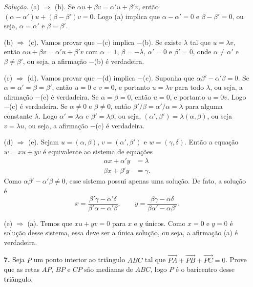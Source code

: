 \documentclass[a4paper,11pt]{article}
\begin{document}
\vspace{\baselineskip}

\emph{Solução.}
(a) $\Rightarrow$ (b).
Se $\alpha u + \beta v = \alpha' u + \beta' v$, então $(\alpha - \alpha')u + (\beta - \beta') v = 0$.
Logo (a) implica que $\alpha - \alpha' = 0$ e $\beta - \beta' = 0$, ou seja, $\alpha = \alpha'$ e $\beta = \beta'$.

(b) $\Rightarrow$ (c).
Vamos provar que $-$(c) implica $-$(b).
Se existe $\lambda$ tal que $u = \lambda v$, então $\alpha u + \beta v = \alpha' u + \beta' v$ com $\alpha = 1$, $\beta = -\lambda$, $\alpha' = 0$ e $\beta' = 0$, onde $\alpha \neq \alpha'$ e $\beta \neq \beta'$, ou seja, a afirmação $-$(b) é verdadeira.

(c) $\Rightarrow$ (d).
Vamos provar que $-$(d) implica $-$(c).
Suponha que $\alpha \beta' - \alpha' \beta = 0$.
Se $\alpha = \alpha' = \beta = \beta'$, então $u = 0$ e $v = 0$, e portanto $u = \lambda v$ para todo $\lambda$, ou seja, a afirmação $-$(c) é verdadeira.
Se $\alpha = \beta = 0$, então $u = 0$, e portanto $u = 0v$.
Logo $-$(c) é verdadeira.
Se $\alpha \neq 0$ e $\beta \neq 0$, então $\beta'/\beta = \alpha'/\alpha = \lambda$ para alguma constante $\lambda$.
Logo $\alpha' = \lambda \alpha$ e $\beta' = \lambda \beta$, ou seja, $(\alpha', \beta') = \lambda (\alpha, \beta)$, ou seja $v = \lambda u$, ou seja, a afirmação $-$(c) é verdadeira.

(d) $\Rightarrow$ (e).
Sejam $u = (\alpha,\beta)$, $v = (\alpha',\beta')$ e $w = (\gamma,\delta)$.
Então a equação $w = xu + yv$ é equivalente ao sistema de equações
\begin{align*}
  \alpha x + \alpha' y & = \lambda \\
  \beta x + \beta' y & = \gamma.
\end{align*}
Como $\alpha \beta' - \alpha' \beta \neq 0$, esse sistema possui apenas uma solução.
De fato, a solução é
\[
  x = \frac{\beta' \gamma - \alpha' \delta}{\beta' \alpha - \alpha' \beta}, \qquad y = \frac{\beta \gamma - \alpha \delta}{\beta \alpha' - \alpha \beta'}.
\]

(e) $\Rightarrow$ (a).
Temos que $xu + yv = 0$ para $x$ e $y$ únicos.
Como $x = 0$ e $y = 0$ é solução desse sistema, essa deve ser a única solução, ou seja, a afirmação (a) é verdadeira.

\vspace{\baselineskip}

\textbf{7.}
Seja $P$ um ponto interior ao triângulo $ABC$ tal que $\overrightarrow{PA} \!+\! \overrightarrow{PB} + \overrightarrow{PC} = 0$.
Prove que as retas $AP$, $BP$ e $CP$ são medianas de $ABC$, logo $P$ é o ba\-ri\-cen\-tro desse triângulo.
\end{document}
